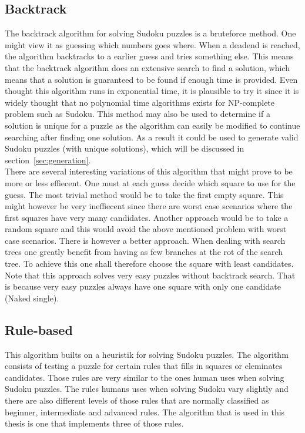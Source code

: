 \documentclass[a4paper,11pt]{kth-mag}
\begin{document}
\subsection{Backtrack}
The backtrack algorithm for solving Sudoku puzzles is a bruteforce method.
One might view it as guessing which numbers goes where.
When a deadend is reached, the algorithm backtracks to a earlier guess and tries something else.
This means that the backtrack algorithm does an extensive search to find a solution, which means that a solution is guaranteed to be found if enough time is provided.
Even thought this algorithm runs in exponential time, it is plausible to try it since it is widely thought that no polynomial time algorithms exists for NP-complete problem such as Sudoku. 
This method may also be used to determine if a solution is unique for a puzzle as the algorithm can easily be modified to continue searching after finding one solution.
As a result it could be used to generate valid Sudoku puzzles (with unique solutions), which will be discussed in section~\ref{sec:generation}.\\
There are several interesting variations of this algorithm that might prove to be more or less effiecent.
One must at each guess decide which square to use for the guess.
The most trivial method would be to take the first empty square.
This might however be very ineffiecent since there are worst case scenarios where the first squares have very many candidates.
Another approach would be to take a random square and this would avoid the above mentioned problem with worst case scenarios.
There is however a better approach.
When dealing with search trees one greatly benefit from having as few branches at the rot of the search tree.
To achieve this one shall therefore choose the square with least candidates.
Note that this approach solves very easy puzzles without backtrack search.
That is because very easy puzzles always have one square with only one candidate (Naked single).

\FloatBarrier
\subsection{Rule-based}
This algorithm builts on a heuristik for solving Sudoku puzzles.
The algorithm consists of testing a puzzle for certain rules that fills in squares or eleminates candidates.
Those rules are very similar to the ones human uses when solving Sudoku puzzles.
The rules humans uses when solving Sudoku vary slightly and there are also different levels of those rules that are normally classified as beginner, intermediate and advanced rules.
The algorithm that is used in this thesis is one that implements three of those rules.
\end{document}
